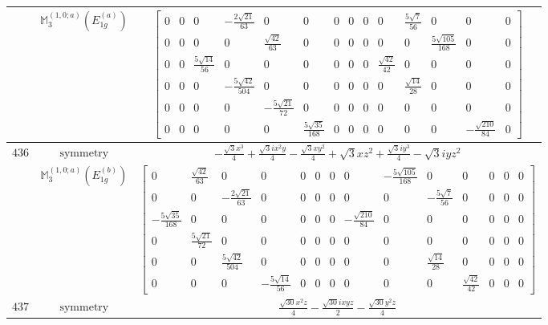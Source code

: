 \documentclass[fleqn,8pt,landscape]{jsarticle}
\begin{document}
\begin{longtable}{ccc}
$  $ & $ \mathbb{M}_{3}^{(1,0;a)}(E_{1g}^{(a)}) $ & $ \begin{bmatrix} 0 & 0 & 0 & - \frac{2 \sqrt{21}}{63} & 0 & 0 & 0 & 0 & 0 & 0 & \frac{5 \sqrt{7}}{56} & 0 & 0 & 0 \\ 0 & 0 & 0 & 0 & \frac{\sqrt{42}}{63} & 0 & 0 & 0 & 0 & 0 & 0 & \frac{5 \sqrt{105}}{168} & 0 & 0 \\ 0 & 0 & \frac{5 \sqrt{14}}{56} & 0 & 0 & 0 & 0 & 0 & 0 & \frac{\sqrt{42}}{42} & 0 & 0 & 0 & 0 \\ 0 & 0 & 0 & - \frac{5 \sqrt{42}}{504} & 0 & 0 & 0 & 0 & 0 & 0 & \frac{\sqrt{14}}{28} & 0 & 0 & 0 \\ 0 & 0 & 0 & 0 & - \frac{5 \sqrt{21}}{72} & 0 & 0 & 0 & 0 & 0 & 0 & 0 & 0 & 0 \\ 0 & 0 & 0 & 0 & 0 & \frac{5 \sqrt{35}}{168} & 0 & 0 & 0 & 0 & 0 & 0 & - \frac{\sqrt{210}}{84} & 0 \end{bmatrix} $ \\ \hline
$ 436 $ & $ \text{symmetry} $ & $ - \frac{\sqrt{3} x^{3}}{4} + \frac{\sqrt{3} i x^{2} y}{4} - \frac{\sqrt{3} x y^{2}}{4} + \sqrt{3} x z^{2} + \frac{\sqrt{3} i y^{3}}{4} - \sqrt{3} i y z^{2} $ \\
$  $ & $ \mathbb{M}_{3}^{(1,0;a)}(E_{1g}^{(b)}) $ & $ \begin{bmatrix} 0 & \frac{\sqrt{42}}{63} & 0 & 0 & 0 & 0 & 0 & 0 & - \frac{5 \sqrt{105}}{168} & 0 & 0 & 0 & 0 & 0 \\ 0 & 0 & - \frac{2 \sqrt{21}}{63} & 0 & 0 & 0 & 0 & 0 & 0 & - \frac{5 \sqrt{7}}{56} & 0 & 0 & 0 & 0 \\ - \frac{5 \sqrt{35}}{168} & 0 & 0 & 0 & 0 & 0 & 0 & - \frac{\sqrt{210}}{84} & 0 & 0 & 0 & 0 & 0 & 0 \\ 0 & \frac{5 \sqrt{21}}{72} & 0 & 0 & 0 & 0 & 0 & 0 & 0 & 0 & 0 & 0 & 0 & 0 \\ 0 & 0 & \frac{5 \sqrt{42}}{504} & 0 & 0 & 0 & 0 & 0 & 0 & \frac{\sqrt{14}}{28} & 0 & 0 & 0 & 0 \\ 0 & 0 & 0 & - \frac{5 \sqrt{14}}{56} & 0 & 0 & 0 & 0 & 0 & 0 & \frac{\sqrt{42}}{42} & 0 & 0 & 0 \end{bmatrix} $ \\ \hline
$ 437 $ & $ \text{symmetry} $ & $ \frac{\sqrt{30} x^{2} z}{4} - \frac{\sqrt{30} i x y z}{2} - \frac{\sqrt{30} y^{2} z}{4} $ \\

\end{longtable}
\end{document}
